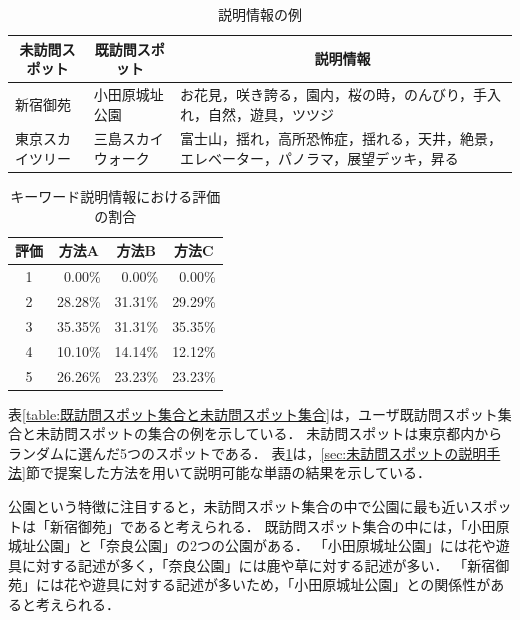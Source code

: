 \documentclass{deimj}
\begin{document}
\begin{table}[t]
  \caption{説明情報の例}
  \label{table:説明情報の例}
  \centering
  \begin{tabular}{l|l|l}
  \hline
  \multicolumn{1}{c|}{未訪問スポット} & \multicolumn{1}{c|}{既訪問スポット} & \multicolumn{1}{c}{説明情報}                     \\ \hline
  新宿御苑                      & 小田原城址公園                         & お花見，咲き誇る，園内，桜の時，のんびり，手入れ，自然，遊具，ツツジ          \\
  東京スカイツリー                     & 三島スカイウォーク                    & 富士山，揺れ，高所恐怖症，揺れる，天井，絶景，エレベーター，パノラマ，展望デッキ，昇る \\ \hline
  \end{tabular}
\end{table}

\begin{table}[t]
  \caption{キーワード説明情報における評価の割合}
  \label{table:キーワード説明情報における評価の割合}
  \centering
  \begin{tabular}{c|r|r|r}
  \hline
  評価 & \multicolumn{1}{c|}{方法A} & \multicolumn{1}{c|}{方法B} & \multicolumn{1}{c}{方法C} \\ \hline
  1  & 0.00\%                   & 0.00\%                   & 0.00\%                  \\
  2  & 28.28\%                  & 31.31\%                  & 29.29\%                 \\
  3  & 35.35\%                  & 31.31\%                  & 35.35\%                 \\
  4  & 10.10\%                   & 14.14\%                  & 12.12\%                 \\
  5  & 26.26\%                  & 23.23\%                  & 23.23\%                 \\ \hline
  \end{tabular}
\end{table}

表\ref{table:既訪問スポット集合と未訪問スポット集合}は，ユーザ既訪問スポット集合と未訪問スポットの集合の例を示している．
未訪問スポットは東京都内からランダムに選んだ5つのスポットである．
表\ref{table:説明情報の例}は，\ref{sec:未訪問スポットの説明手法}節で提案した方法を用いて説明可能な単語の結果を示している．

公園という特徴に注目すると，未訪問スポット集合の中で公園に最も近いスポットは「新宿御苑」であると考えられる．
既訪問スポット集合の中には，「小田原城址公園」と「奈良公園」の2つの公園がある．
「小田原城址公園」には花や遊具に対する記述が多く，「奈良公園」には鹿や草に対する記述が多い．
「新宿御苑」には花や遊具に対する記述が多いため，「小田原城址公園」との関係性があると考えられる．
\end{document}
